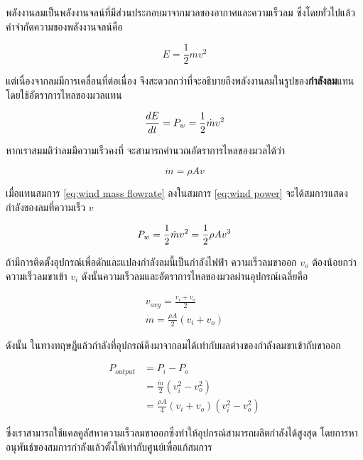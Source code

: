 \message{ !name(solar.tex)}\documentclass[
a4paper,
svgnames,
openany,
justified,
]{tufte-book}
\begin{document}
พลังงานลมเป็นพลังงานจลน์ที่มีส่วนประกอบมาจากมวลของอากาศและความเร็วลม ซึ่งโดยทั่วไปแล้ว คำจำกัดความของพลังงานจลน์คือ

$$ E = \frac{1}{2} mv^2 $$

แต่เนื่องจากลมมีการเคลื่อนที่ต่อเนื่อง จึงสะดวกกว่าที่จะอธิบายถึงพลังงานลมในรูปของ\textbf{กำลังลม}แทนโดยใช้อัตราการไหลของมวลแทน

\begin{equation}
  \label{eq:wind power}
  \frac{dE}{dt} = P_w = {1 \over 2} \dot{m} v^2
\end{equation}

หากเราสมมติว่าลมมีความเร็วคงที่ จะสามารถคำนวณอัตราการไหลของมวลได้ว่า

\begin{equation}
  \label{eq:wind mass flowrate}
  \dot{m} = \rho A v
\end{equation}

เมื่อแทนสมการ \ref{eq:wind mass flowrate} ลงในสมการ \ref{eq:wind power} จะได้สมการแสดงกำลังของลมที่ความเร็ว $v$ 

\begin{equation}
 \label{eq:wind power v}
 P_w = {1 \over 2} \dot{m} v^2 = {1 \over 2} \rho A v^3
\end{equation}

ถ้ามีการติดตั้งอุปกรณ์เพื่อดักและแปลงกำลังลมนี้เป็นกำลังไฟฟ้า ความเร็วลมขาออก $v_o$ ต้องน้อยกว่าความเร็วลมขาเข้า $v_i$ ดังนั้นความเร็วลมและอัตราการไหลของมวลผ่านอุปกรณ์เฉลี่ยคือ

\begin{gather}
  v_{avg} = \frac{v_i + v_o}{2} \\
  \dot{m} = \frac{\rho A}{2} \left( v_i + v_o \right)
  \label{eq:average wind speed through turbine}
\end{gather}

ดังนั้น ในทางทฤษฎีแล้วกำลังที่อุปกรณ์ดึงมาจากลมได้เท่ากับผลต่างของกำลังลมขาเข้ากับขาออก

\begin{align*}
  P_{output} &= P_{i} - P_{o} \\
              &= \frac{\dot{m}}{2} \left( v_i^2 - v_o^2 \right) \\
              &= \frac{\rho A}{4} \left( v_i + v_o \right)\left( v_i^2 - v_o^2 \right)
\end{align*}

ซึ่งเราสามารถใช้แคลคูลัสหาความเร็วลมขาออกซึ่งทำให้อุปกรณ์สามารถผลิตกำลังได้สูงสุด โดยการหาอนุพันธ์ของสมการกำลังแล้วตั้งให้เท่ากับศูนย์เพื่อแก้สมการ
\end{document}
